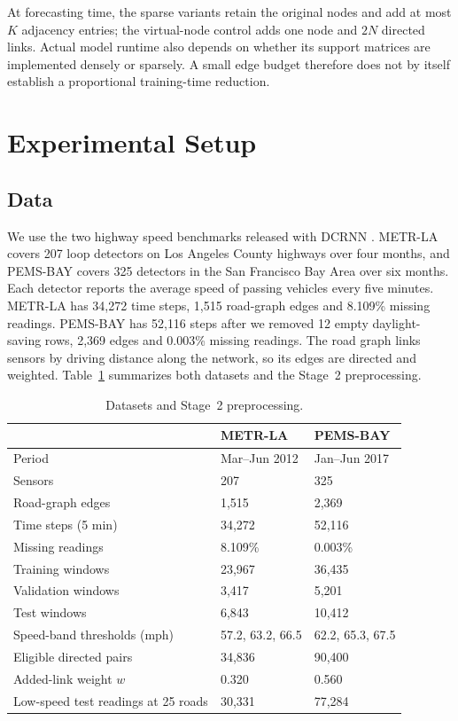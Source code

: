 \documentclass[journal]{IEEEtran}
\begin{document}
At forecasting time, the sparse variants retain the original nodes and add at most $K$ adjacency entries; the virtual-node control adds one node and $2N$ directed links. Actual model runtime also depends on whether its support matrices are implemented densely or sparsely. A small edge budget therefore does not by itself establish a proportional training-time reduction.

\section{Experimental Setup}\label{sec:setup}
\subsection{Data}
We use the two highway speed benchmarks released with DCRNN \cite{li2018dcrnn}. METR-LA covers 207 loop detectors on Los Angeles County highways over four months, and PEMS-BAY covers 325 detectors in the San Francisco Bay Area over six months. Each detector reports the average speed of passing vehicles every five minutes. METR-LA has 34{,}272 time steps, 1{,}515 road-graph edges and 8.109\% missing readings. PEMS-BAY has 52{,}116 steps after we removed 12 empty daylight-saving rows, 2{,}369 edges and 0.003\% missing readings. The road graph links sensors by driving distance along the network, so its edges are directed and weighted. Table~\ref{tab:data} summarizes both datasets and the Stage~2 preprocessing.

\begin{table}[!t]
\centering
\caption{Datasets and Stage~2 preprocessing.}
\label{tab:data}
\footnotesize
\setlength{\tabcolsep}{3pt}
\begin{tabular}{@{}lll@{}}
\toprule
& METR-LA & PEMS-BAY \\
\midrule
Period & Mar--Jun 2012 & Jan--Jun 2017 \\
Sensors & 207 & 325 \\
Road-graph edges & 1{,}515 & 2{,}369 \\
Time steps (5 min) & 34{,}272 & 52{,}116 \\
Missing readings & 8.109\% & 0.003\% \\
Training windows & 23{,}967 & 36{,}435 \\
Validation windows & 3{,}417 & 5{,}201 \\
Test windows & 6{,}843 & 10{,}412 \\
Speed-band thresholds (mph) & 57.2, 63.2, 66.5 & 62.2, 65.3, 67.5 \\
Eligible directed pairs & 34{,}836 & 90{,}400 \\
Added-link weight $w$ & 0.320 & 0.560 \\
Low-speed test readings at 25 roads & 30{,}331 & 77{,}284 \\
\bottomrule
\end{tabular}
\end{table}
\end{document}

